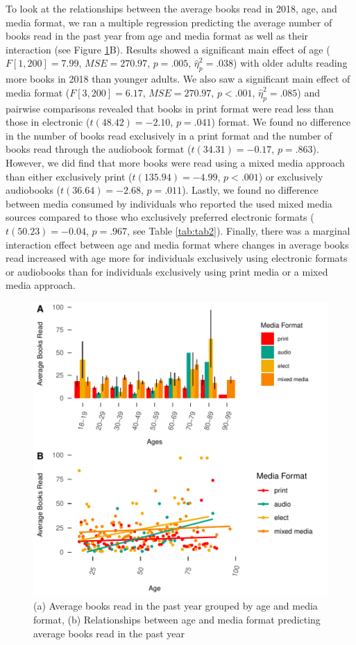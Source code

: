 \documentclass[man, fleqn, noextraspace]{apa6}
\theoremstyle{definition}
\theoremstyle{definition}
\theoremstyle{definition}
\theoremstyle{remark}
\begin{document}
To look at the relationships between the average books read in 2018,
age, and media format, we ran a multiple regression predicting the
average number of books read in the past year from age and media format
as well as their interaction (see Figure \ref{fig:fig4}B). Results
showed a significant main effect of age (\(F[1, 200] = 7.99\),
\(\mathit{MSE} = 270.97\), \(p = .005\), \(\hat{\eta}^2_p = .038\)) with
older adults reading more books in 2018 than younger adults. We also saw
a significant main effect of media format (\(F[3, 200] = 6.17\),
\(\mathit{MSE} = 270.97\), \(p < .001\), \(\hat{\eta}^2_p = .085\)) and
pairwise comparisons revealed that books in print format were read less
than those in electronic (\(t(48.42) = -2.10\), \(p = .041\)) format. We
found no difference in the number of books read exclusively in a print
format and the number of books read through the audiobook format
(\(t(34.31) = -0.17\), \(p = .863\)). However, we did find that more
books were read using a mixed media approach than either exclusively
print (\(t(135.94) = -4.99\), \(p < .001\)) or exclusively audiobooks
(\(t(36.64) = -2.68\), \(p = .011\)). Lastly, we found no difference
between media consumed by individuals who reported the used mixed media
sources compared to those who exclusively preferred electronic formats
(\(t(50.23) = -0.04\), \(p = .967\), see Table \ref{tab:tab2}). Finally,
there was a marginal interaction effect between age and media format
where changes in average books read increased with age more for
individuals exclusively using electronic formats or audiobooks than for
individuals exclusively using print media or a mixed media approach.

\begin{figure}
\centering
\includegraphics{final_manuscript_files/figure-latex/fig4-1.pdf}
\caption{\label{fig:fig4}(a) Average books read in the past year grouped by
age and media format, (b) Relationships between age and media format
predicting average books read in the past year}
\end{figure}
\end{document}
